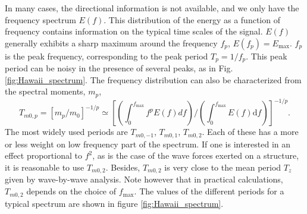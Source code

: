 In many cases, the directional information is not available, and we only have the frequency spectrum $E(f)$. 
This distribution of the energy as a function of frequency contains information on the typical time scales of the signal. $E(f)$ generally exhibits 
a sharp maximum around the frequency $f_p$, $E(f_{p})=E_{\max}$. $f_p$ is the peak frequency, corresponding to the peak period $T_{p}=1/f_p$.  
This peak period can be noisy in the presence of several peaks, as in Fig. \ref{fig:Hawaii_spectrum}.
The frequency distribution can also be characterized from the spectral moments, $m_p$, 
\begin{equation}
T_{m0,p} =  \left[m_p/m_0\right]^{-1/p} \simeq \left[\left(\int_{0}^{f_{\max}} f^{p} E(f) df\right)/\left({\int_{0}^{f_{\max}} E(f) {\mathrm d}f}\right)\right]^{-1/p}.
\label{eq3.17}
\end{equation}
The most widely used periods are $T_{m0,-1}$, $T_{m0,1}$, $T_{m0,2}$. Each of these has a more or less weight on low frequency part of the spectrum.
If one is interested in an effect proportional to $f^2$, as is  the case of the wave forces exerted on a structure, it is reasonable to use $T_{m0,2}$.
Besides, $T_{m0,2}$ is very close to the mean period $T_z$ given by  wave-by-wave analysis. Note however that in practical calculations, $T_{m0,2}$ depends on the choice
of $f_{\max}$. The values of the different periods for a typical spectrum are shown in figure 
\ref{fig:Hawaii_spectrum}.

